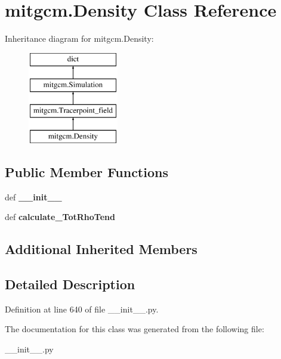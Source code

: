 \hypertarget{classmitgcm_1_1Density}{\section{mitgcm.\+Density Class Reference}
\label{classmitgcm_1_1Density}
}
Inheritance diagram for mitgcm.\+Density\+:\begin{figure}[H]
\begin{center}
\leavevmode
\includegraphics[height=4.000000cm]{classmitgcm_1_1Density}
\end{center}
\end{figure}
\subsection*{Public Member Functions}
\begin{DoxyCompactItemize}
\item 
\hypertarget{classmitgcm_1_1Density_aebdb54f40c181a305136c8d877c188d1}{def {\bfseries \+\_\+\+\_\+init\+\_\+\+\_\+}}\label{classmitgcm_1_1Density_aebdb54f40c181a305136c8d877c188d1}

\item 
\hypertarget{classmitgcm_1_1Density_a8838db86600856226b8856ae1b0ab7e6}{def {\bfseries calculate\+\_\+\+Tot\+Rho\+Tend}}\label{classmitgcm_1_1Density_a8838db86600856226b8856ae1b0ab7e6}

\end{DoxyCompactItemize}
\subsection*{Additional Inherited Members}


\subsection{Detailed Description}


Definition at line 640 of file \+\_\+\+\_\+init\+\_\+\+\_\+.\+py.



The documentation for this class was generated from the following file\+:\begin{DoxyCompactItemize}
\item 
\+\_\+\+\_\+init\+\_\+\+\_\+.\+py\end{DoxyCompactItemize}
